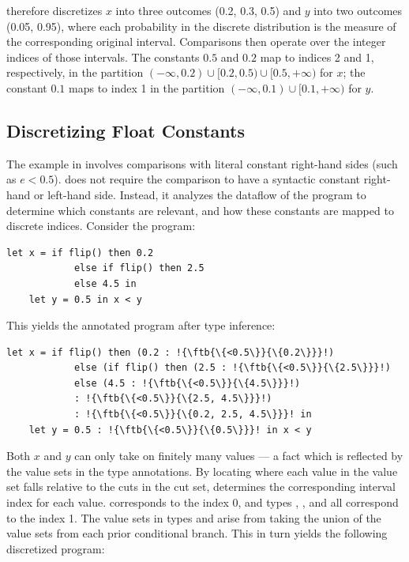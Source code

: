\Slice{} therefore discretizes $x$ into three outcomes \discrete(0.2, 0.3, 0.5) and $y$ into two outcomes \discrete(0.05, 0.95), where each probability in the discrete distribution is the measure of the corresponding original interval. Comparisons then operate over the integer indices of those intervals. The constants $0.5$ and $0.2$ map to indices 2 and 1, respectively, in the partition $(-\infty,0.2)\cup[0.2,0.5)\cup[0.5,+\infty)$ for $x$; the constant $0.1$ maps to index 1 in the partition $(-\infty,0.1)\cup[0.1,+\infty)$ for $y$.


\iffalse
\subsection{Discretizing Float Constants}\label{sec:examples:3}
The example in  involves comparisons with literal constant right-hand sides (such as $e < 0.5$).
\Slice{} does not require the comparison to have a syntactic constant right-hand or left-hand side. Instead, it analyzes the dataflow of the program to determine which constants are relevant, and how these constants are mapped to discrete indices.
Consider the program:

\begin{lstlisting}[aboveskip=1em,belowskip=1em,escapechar=!,gobble=4]
    let x = if flip() then 0.2
            else if flip() then 2.5
            else 4.5 in
    let y = 0.5 in x < y
\end{lstlisting}

This yields the annotated program after type inference:

\begin{lstlisting}[aboveskip=1em,belowskip=1em,escapechar=!,gobble=4]
    let x = if flip() then (0.2 : !{\ftb{\{<0.5\}}{\{0.2\}}}!)
            else (if flip() then (2.5 : !{\ftb{\{<0.5\}}{\{2.5\}}}!)
            else (4.5 : !{\ftb{\{<0.5\}}{\{4.5\}}}!)
            : !{\ftb{\{<0.5\}}{\{2.5, 4.5\}}}!)
            : !{\ftb{\{<0.5\}}{\{0.2, 2.5, 4.5\}}}! in
    let y = 0.5 : !{\ftb{\{<0.5\}}{\{0.5\}}}! in x < y
\end{lstlisting}

Both $x$ and $y$ can only take on finitely many values --- a fact which is reflected by the value sets in the type annotations. By locating where each value in the value set falls relative to the cuts in the cut set, \Slice{} determines the corresponding interval index for each value.  corresponds to the index 0, and types , , and  all correspond to the index 1. The value sets in types  and  arise from taking the union of the value sets from each prior conditional branch. This in turn yields the following discretized program:


